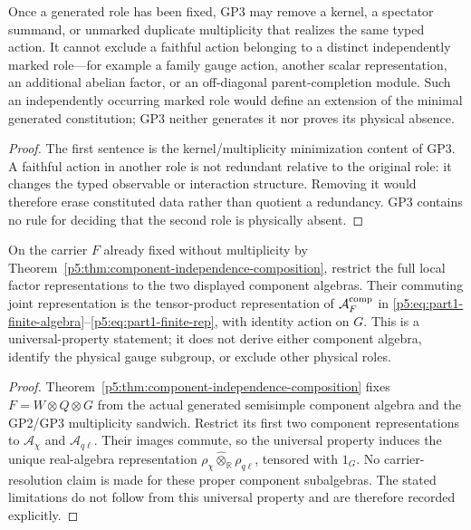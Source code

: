 \documentclass[12pt,a4paper]{article}
\begin{document}
\begin{lemma}
\label{p5:lem:minimal-sector-enlargement-trichotomy}
Once a generated role has been fixed, GP3 may remove a kernel, a spectator
summand, or unmarked duplicate multiplicity that realizes the same typed
action.  It cannot exclude a faithful action belonging to a distinct
independently marked role---for example a family gauge action, another scalar
representation, an additional abelian factor, or an off-diagonal
parent-completion module.  Such an independently occurring marked role would
define an extension of the minimal generated constitution; GP3 neither
generates it nor proves its physical absence.
\end{lemma}

\begin{proof}
The first sentence is the kernel/multiplicity minimization content of GP3.
A faithful action in another role is not redundant relative to the original
role: it changes the typed observable or interaction structure.  Removing it
would therefore erase constituted data rather than quotient a redundancy.
GP3 contains no rule for deciding that the second role is physically absent.
\end{proof}

\begin{theorem}
\label{p5:thm:part1-minimal-sector-algebra}
On the carrier \(F\) already fixed without multiplicity by
Theorem~\ref{p5:thm:component-independence-composition}, restrict the full
local factor representations to the two displayed component algebras.  Their
commuting joint representation is the tensor-product
representation of \(\mathcal A_F^{\rm comp}\) in
\eqref{p5:eq:part1-finite-algebra}--\eqref{p5:eq:part1-finite-rep}, with
identity action on \(G\).  This is a universal-property statement; it does not
derive either component algebra, identify the physical gauge subgroup, or
exclude other physical roles.
\end{theorem}

\begin{proof}
Theorem~\ref{p5:thm:component-independence-composition} fixes
\(F=W\otimes Q\otimes G\) from the actual generated semisimple component
algebra and the GP2/GP3 multiplicity sandwich.  Restrict its first two
component representations to \(\mathcal A_\chi\) and
\(\mathcal A_{q\ell}\).  Their images commute, so the
universal property induces the unique real-algebra representation
\(\rho_\chi\widehat\otimes_{\mathbb R}\rho_{q\ell}\), tensored with \(1_G\).
No carrier-resolution claim is made for these proper component subalgebras.
The stated limitations do not follow from this universal property and are
therefore recorded explicitly.
\end{proof}
\end{document}
